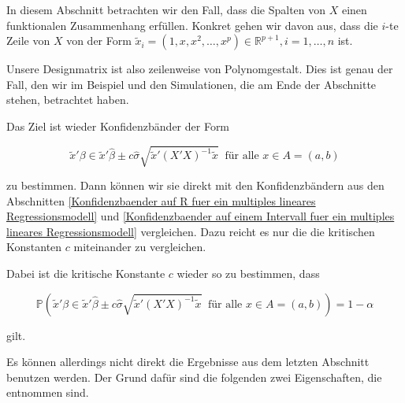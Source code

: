 \documentclass[12pt,a4paper]{article}
\theoremstyle{definition}
\theoremstyle{definition}
\theoremstyle{definition}
\theoremstyle{definition}
\begin{document}
In diesem Abschnitt betrachten wir den Fall, dass die Spalten von $X$ einen funktionalen Zusammenhang erfüllen. Konkret gehen wir davon aus, dass die $i$-te Zeile von $X$ von der Form $\tilde{x}_i = (1, x, x^{2}, \ldots, x^{p}) \in \mathbb{R}^{p+1}, i = 1, \ldots, n$ ist. 

Unsere Designmatrix ist also zeilenweise von Polynomgestalt. Dies ist genau der Fall, den wir im Beispiel und den Simulationen, die am Ende der Abschnitte stehen, betrachtet haben. 

Das Ziel ist wieder Konfidenzbänder der Form 

\begin{equation}
\tilde{x}' \beta \in \tilde{x}' \hat{\beta} \pm c \hat{\sigma} \sqrt{\tilde{x}'(X'X)^{-1}\tilde{x}} ~ \text{ für alle } x \in A=(a,b)
\end{equation}

zu bestimmen. Dann können wir sie direkt mit den Konfidenzbändern aus den Abschnitten \ref{Konfidenzbaender auf R fuer ein multiples lineares Regressionsmodell} und \ref{Konfidenzbaender auf einem Intervall fuer ein multiples lineares Regressionsmodell} vergleichen. Dazu reicht es nur die  die kritischen Konstanten $c$ miteinander zu vergleichen. 

Dabei ist die kritische Konstante $c$ wieder so zu bestimmen, dass

\begin{equation*}
\mathbb{P} \left( \tilde{x}' \beta \in \tilde{x}' \hat{\beta} \pm c \hat{\sigma} \sqrt{\tilde{x}'(X'X)^{-1} \tilde{x}} ~ \text{ für alle } x \in A=(a,b) \right) = 1 - \alpha
\end{equation*}

gilt. 

Es können allerdings nicht direkt die Ergebnisse aus dem letzten Abschnitt benutzen werden. Der Grund dafür sind die folgenden zwei Eigenschaften, die \cite[180]{Liu64} entnommen sind.
\end{document}
